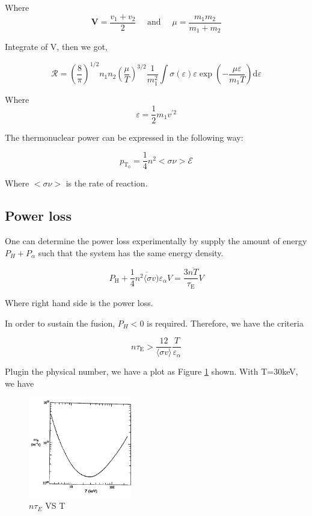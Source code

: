 Where $$
\mathbf{V}=\frac{v_{1}+v_{2}}{2} \quad \text { and } \quad \mu=\frac{m_{1} m_{2}}{m_{1}+m_{2}}
$$

Integrate of V, then we got, 

\begin{equation}
\mathcal{R}=\left(\frac{8}{\pi}\right)^{1 / 2} n_{1} n_{2}\left(\frac{\mu}{T}\right)^{3 / 2} \frac{1}{m_{1}^{2}} \int \sigma(\varepsilon) \varepsilon \exp \left(-\frac{\mu \varepsilon}{m_{1} T}\right) \mathrm{d} \varepsilon
\end{equation}

Where \begin{equation}
\varepsilon=\frac{1}{2} m_{1} v^{\prime 2}
\end{equation}

The thermonuclear power can be expressed in the following way:

\begin{equation}
p_{\mathrm{T}_{0}}=\frac{1}{4} n^{2}<\sigma \nu> \mathcal{E}
\end{equation}

Where $<\sigma \nu>$ is the rate of reaction. 

\subsection{Power loss}

One can determine the power loss experimentally by supply the amount of energy $P_H+P_\alpha$ such that the system has the same energy density. 

\begin{equation}
P_{\mathrm{H}}+\frac{1}{4} \overline{n^{2}\langle\sigma v)} \varepsilon_{\alpha} V=\frac{3 \overline{n T}}{\tau_{\mathrm{E}}} V
\end{equation}

Where right hand side is the power loss. 

In order to sustain the fusion, $P_H <0$ is required. Therefore, we have the criteria 

\begin{equation}
n \tau_{\mathrm{E}}>\frac{12}{\langle\sigma v\rangle} \frac{T}{\varepsilon_{\alpha}}
\end{equation}

Plugin the physical number, we have a plot as Figure \ref{fig:ignition} shown. With T=30keV, we have


\begin{figure}[h] \centering
        \includegraphics[width=0.4\textwidth]{Image/Ignition.png}
        \caption{$n\tau_E$ VS T}
        \label{fig:ignition}
\end{figure}

